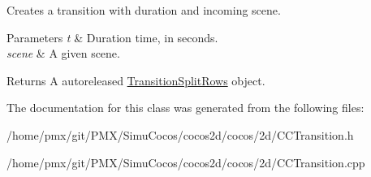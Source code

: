 Creates a transition with duration and incoming scene.


\begin{DoxyParams}{Parameters}
{\em t} & Duration time, in seconds. \\
\hline
{\em scene} & A given scene. \\
\hline
\end{DoxyParams}
\begin{DoxyReturn}{Returns}
A autoreleased \hyperlink{classTransitionSplitRows}{Transition\+Split\+Rows} object. 
\end{DoxyReturn}


The documentation for this class was generated from the following files\+:\begin{DoxyCompactItemize}
\item 
/home/pmx/git/\+P\+M\+X/\+Simu\+Cocos/cocos2d/cocos/2d/C\+C\+Transition.\+h\item 
/home/pmx/git/\+P\+M\+X/\+Simu\+Cocos/cocos2d/cocos/2d/C\+C\+Transition.\+cpp\end{DoxyCompactItemize}
